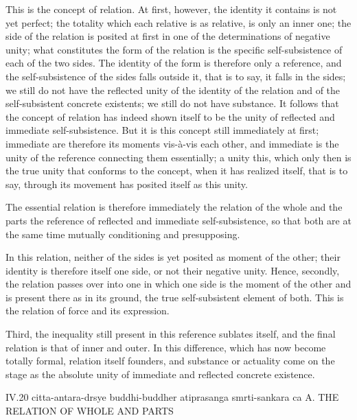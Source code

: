 This is the concept of relation.
At first, however, the identity it contains
is not yet perfect;
the totality which each relative is as relative,
is only an inner one;
the side of the relation is posited at first
in one of the determinations of negative unity;
what constitutes the form of the relation is
the specific self-subsistence of each of the two sides.
The identity of the form is therefore only a reference,
and the self-subsistence of the sides falls outside it,
that is to say, it falls in the sides;
we still do not have the reflected unity
of the identity of the relation
and of the self-subsistent concrete existents;
we still do not have substance.
It follows that the concept of relation has
indeed shown itself to be the unity
of reflected and immediate self-subsistence.
But it is this concept still immediately at first;
immediate are therefore its moments vis-à-vis each other,
and immediate is the unity of the reference
connecting them essentially;
a unity this, which only then is the true unity
that conforms to the concept,
when it has realized itself, that is to say,
through its movement has posited itself as this unity.

The essential relation is therefore immediately
the relation of the whole and the parts
the reference of reflected and immediate self-subsistence,
so that both are at the same time
mutually conditioning and presupposing.

In this relation, neither of the sides is
yet posited as moment of the other;
their identity is therefore itself one side,
or not their negative unity.
Hence, secondly, the relation passes over into one
in which one side is the moment of the other
and is present there as in its ground,
the true self-subsistent element of both.
This is the relation of force and its expression.

Third, the inequality still present
in this reference sublates itself,
and the final relation is that of inner and outer.
In this difference,
which has now become totally formal,
relation itself founders,
and substance or actuality come on the stage
as the absolute unity of
immediate and reflected concrete existence.

IV.20
citta-antara-drsye buddhi-buddher atiprasanga smrti-sankara ca
A. THE RELATION OF WHOLE AND PARTS

